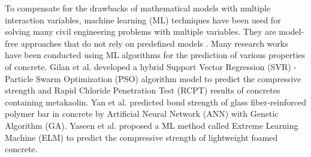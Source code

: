 \documentclass[11pt]{article}
\begin{document}
	
	
	To compensate for the drawbacks of mathematical models with multiple interaction variables, machine learning (ML) techniques have been used for solving many civil engineering problems with multiple variables. They are model-free approaches that do not rely on predefined models \cite{reuter2018comparative}. Many research works have been conducted using ML algorithms for the prediction of various properties of concrete. Gilan et al.\cite{gilan2012hybrid} developed a hybrid Support Vector Regression (SVR) - Particle Swarm Optimization (PSO) algorithm model to predict the compressive strength and Rapid Chloride Penetration Test (RCPT) results of concretes containing metakaolin. Yan et al. \cite{yan2017evaluation} predicted bond strength of glass fiber-reinforced polymer bar in concrete by Artificial Neural Network (ANN) with Genetic Algorithm (GA). Yaseen et al.\cite{yaseen2018predicting} proposed a ML method called Extreme Learning Machine (ELM) to predict the compressive strength of lightweight foamed concrete. 
	
\end{document}
